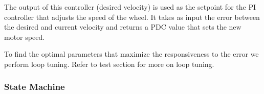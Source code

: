 The output of this controller (desired velocity) is used as the setpoint for the PI controller that adjusts the speed of the wheel. It takes as input the error between the desired and current velocity and returns a PDC value that sets the new motor speed.

To find the optimal parameters that maximize the responsiveness to the error we perform loop tuning. Refer to test section for more on loop tuning. 

\subsubsection{State Machine}



